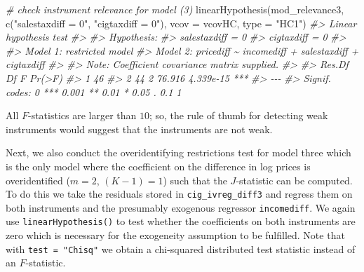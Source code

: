 \documentclass[
  14pt,
]{memoir}
\newenvironment{Shaded}{\begin{snugshade}}{\end{snugshade}}
\newcommand{\AttributeTok}[1]{\textcolor[rgb]{0.77,0.63,0.00}{#1}}
\newcommand{\CommentTok}[1]{\textcolor[rgb]{0.56,0.35,0.01}{\textit{#1}}}
\newcommand{\FunctionTok}[1]{\textcolor[rgb]{0.00,0.00,0.00}{#1}}
\newcommand{\NormalTok}[1]{#1}
\newcommand{\StringTok}[1]{\textcolor[rgb]{0.31,0.60,0.02}{#1}}
\begin{document}
\begin{Shaded}
\begin{Highlighting}[]
\CommentTok{\# check instrument relevance for model (3)}
\FunctionTok{linearHypothesis}\NormalTok{(mod\_relevance3, }
                 \FunctionTok{c}\NormalTok{(}\StringTok{"salestaxdiff = 0"}\NormalTok{, }\StringTok{"cigtaxdiff = 0"}\NormalTok{), }
                 \AttributeTok{vcov =}\NormalTok{ vcovHC, }\AttributeTok{type =} \StringTok{"HC1"}\NormalTok{)}
\CommentTok{\#\textgreater{} Linear hypothesis test}
\CommentTok{\#\textgreater{} }
\CommentTok{\#\textgreater{} Hypothesis:}
\CommentTok{\#\textgreater{} salestaxdiff = 0}
\CommentTok{\#\textgreater{} cigtaxdiff = 0}
\CommentTok{\#\textgreater{} }
\CommentTok{\#\textgreater{} Model 1: restricted model}
\CommentTok{\#\textgreater{} Model 2: pricediff \textasciitilde{} incomediff + salestaxdiff + cigtaxdiff}
\CommentTok{\#\textgreater{} }
\CommentTok{\#\textgreater{} Note: Coefficient covariance matrix supplied.}
\CommentTok{\#\textgreater{} }
\CommentTok{\#\textgreater{}   Res.Df Df      F    Pr(\textgreater{}F)    }
\CommentTok{\#\textgreater{} 1     46                        }
\CommentTok{\#\textgreater{} 2     44  2 76.916 4.339e{-}15 ***}
\CommentTok{\#\textgreater{} {-}{-}{-}}
\CommentTok{\#\textgreater{} Signif. codes:  0 \textquotesingle{}***\textquotesingle{} 0.001 \textquotesingle{}**\textquotesingle{} 0.01 \textquotesingle{}*\textquotesingle{} 0.05 \textquotesingle{}.\textquotesingle{} 0.1 \textquotesingle{} \textquotesingle{} 1}
\end{Highlighting}
\end{Shaded}

All \(F\)-statistics are larger than \(10\); so, the rule of thumb for detecting weak instruments would suggest that the instruments are not weak.

Next, we also conduct the overidentifying restrictions test for model three which is the only model where the coefficient on the difference in log prices is overidentified (\(m=2\), \((K-1)=1\)) such that the \(J\)-statistic can be computed. To do this we take the residuals stored in \texttt{cig\_ivreg\_diff3} and regress them on both instruments and the presumably exogenous regressor \texttt{incomediff}. We again use \texttt{linearHypothesis()} to test whether the coefficients on both instruments are zero which is necessary for the exogeneity assumption to be fulfilled. Note that with \texttt{test\ =\ "Chisq"} we obtain a chi-squared distributed test statistic instead of an \(F\)-statistic.
\end{document}

